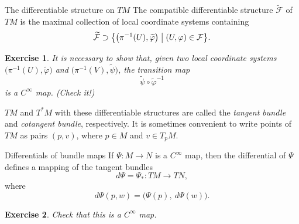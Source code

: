 \documentclass[10pt]{beamer}
\newtheorem{exercise}{Exercise}
\begin{document}
\begin{frame}{The differentiable structure on $TM$}
	The compatible differentiable structure $\widetilde{\mathcal{F}}$ of
	$TM$ is the maximal collection of local coordinate systems containing
	\[
		\widetilde{\mathcal{F}} \supset
		\bigl\{ \bigl( \pi^{-1}(U), \widetilde{\varphi} \bigr)
		\bigm| (U, \varphi) \in \mathcal{F} \bigr\}.
	\]
	\begin{exercise}
		It is necessary to show that, given two local coordinate systems
		$\bigl( \pi^{-1}(U), \widetilde{\varphi} \bigr)$ and
		$\bigl( \pi^{-1}(V), \widetilde{\psi} \bigr)$, the transition map
		\[
			\widetilde{\psi} \circ \widetilde{\varphi}^{-1}
		\]
		is a $C^\infty$ map. (Check it!)
	\end{exercise}
	\bigskip
	$TM$ and $T^*M$ with these differentiable structures are called the
	\emph{tangent bundle} and \emph{cotangent bundle}, respectively. It is
	sometimes convenient to write points of $TM$ as pairs $(p, v)$, where
	$p \in M$ and $v \in T_p M$.
\end{frame}

\begin{frame}{Differentials of bundle maps}
	If $\Psi : M \to N$ is a $C^\infty$ map, then the differential of
	$\Psi$ defines a mapping of the tangent bundles
	\[
		d\Psi = \Psi_* : TM \longrightarrow TN,
	\]
	where
	\[
		d\Psi(p, w) = \bigl( \Psi(p),\ d\Psi(w) \bigr).
	\]
	\begin{exercise}
		Check that this is a $C^\infty$ map.
	\end{exercise}
\end{frame}
\end{document}
